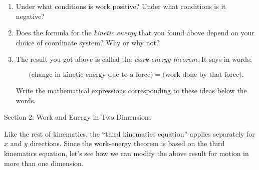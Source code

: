 \documentclass[12pt]{article}
\begin{document}
\begin{enumerate}
	\vspace{1in}

	\item Under what conditions is work positive? Under what conditions is it negative?
	\vspace{2in}
	
	\item Does the formula for the {\it kinetic energy} that you found above depend on your choice of coordinate system? Why or why not?
	
	\vspace{2in}
	
	\item The result you got above is called the {\it work-energy theorem}. It says in words:
	
	$$\text{(change in kinetic energy due to a force)} = \text{(work done by that force)}.$$
	
	\vspace{1in}
	
	Write the mathematical expressions corresponding to these ideas below the words.
\end{enumerate}

\newpage


{\Large Section 2: Work and Energy in Two Dimensions}

 Like the rest of kinematics, the ``third kinematics equation'' applies separately for $x$ and $y$ directions. Since the work-energy theorem is based on the third kinematics equation, let's see how we can modify the above result for motion in more than one dimension.
\end{document}
